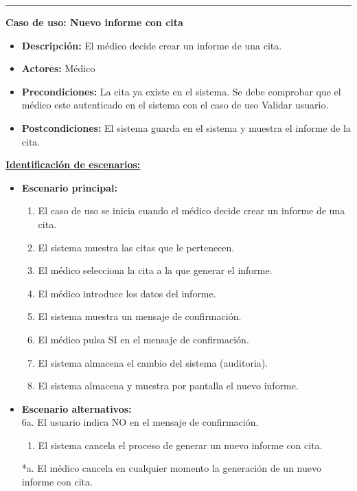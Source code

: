\smallskip
\hrule height 1pt
\smallskip
\textbf{Caso de uso: Nuevo informe con cita}
\begin{itemize}\renewcommand{\labelitemi}{$\cdot$}
 \item \textbf{Descripción:} El médico decide crear un informe de una cita.
  \item \textbf{Actores:} Médico
  \item \textbf{Precondiciones:} La cita ya existe en el sistema. Se debe comprobar que el médico este autenticado en el sistema con el caso de uso Validar usuario.
  \item \textbf{Postcondiciones:} El sistema guarda en el sistema y muestra el informe de la cita.
\end{itemize}
\underline{\textbf{Identificación de escenarios:}}
\begin{itemize}\renewcommand{\labelitemi}{$\circ$}
 \item \textbf{Escenario principal:}
         \begin{enumerate}
          \item El caso de uso se inicia cuando el médico decide crear un informe de una cita.
          \item El sistema muestra las citas que le pertenecen.
          \item El médico selecciona la cita a la que generar el informe.
          \item El médico introduce los datos del informe.
	  \item El sistema muestra un mensaje de confirmación.
          \item El médico pulsa SI en el mensaje de confirmación.
 	  \item El sistema almacena el cambio del sistema (auditoria).
	  \item El sistema almacena y muestra por pantalla el nuevo informe.
         \end{enumerate}
\item \textbf{Escenario alternativos:}\\
  			6a. El usuario indica NO en el mensaje de confirmación.
  			\begin{enumerate}
  			\item El sistema cancela el proceso de generar un nuevo informe con cita.
  			\end{enumerate}
          *a. El médico cancela en cualquier momento la generación de un nuevo informe con cita.
\end{itemize}

